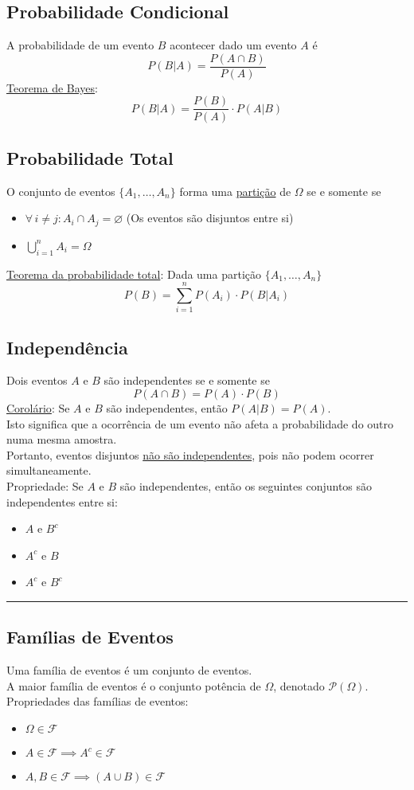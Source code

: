 \documentclass{article}
\begin{document}
\subsection{Probabilidade Condicional}
A probabilidade de um evento $B$ acontecer dado um evento $A$ é
\[ P(B|A) = \frac{P(A \cap B)}{P(A)} \]
\uline{Teorema de Bayes}:
\[ P(B|A) = \frac{P(B)}{P(A)} \cdot P(A|B) \]


\subsection{Probabilidade Total}
O conjunto de eventos $\{ A_1, \hdots, A_n \}$ forma uma \uline{partição} de $\Omega$ se e somente se
\begin{itemize}
  \item $\forall \, i \neq j: A_i \cap A_j = \varnothing$ \quad (Os eventos são disjuntos entre si)
  \item $\bigcup\limits_{i=1}^{n} A_i = \Omega$
\end{itemize}
\uline{Teorema da probabilidade total}: Dada uma partição $\{ A_1, \hdots, A_n \}$
\[ P(B) = \sum_{i = 1}^{n} P(A_i) \cdot P(B|A_i) \]


\subsection{Independência}
Dois eventos $A$ e $B$ são independentes se e somente se
\[ P(A \cap B) = P(A) \cdot P(B) \]
\uline{Corolário}: Se $A$ e $B$ são independentes, então $P(A|B) = P(A)$. \\[10pt]
Isto significa que a ocorrência de um evento não afeta a probabilidade do outro numa mesma amostra. \\
Portanto, eventos disjuntos \uline{não são independentes}, pois não podem ocorrer simultaneamente. \\[10pt]
Propriedade: Se $A$ e $B$ são independentes, então os seguintes conjuntos são independentes entre si:
\begin{itemize}
  \item $A$ e $B^c$
  \item $A^c$ e $B$
  \item $A^c$ e $B^c$
\end{itemize}

\hrule

\subsection{Famílias de Eventos}
Uma família de eventos é um conjunto de eventos. \\
A maior família de eventos é o conjunto potência de $\Omega$, denotado $\mathcal{P}(\Omega)$. \\[5pt]
Propriedades das famílias de eventos:
\begin{itemize}
  \item $\Omega \in \mathcal{F}$
  \item $A \in \mathcal{F} \implies A^c \in \mathcal{F}$
  \item $A, B \in \mathcal{F} \implies (A \cup B) \in \mathcal{F}$
\end{itemize}
\end{document}
